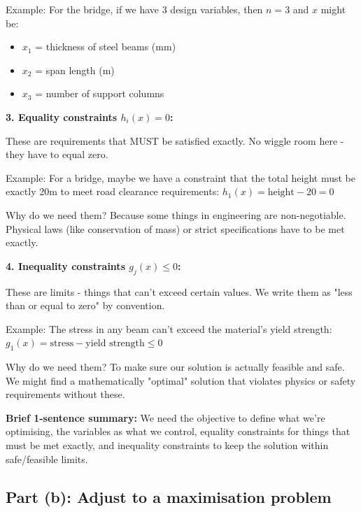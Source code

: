 \documentclass[11pt]{article}
\begin{document}
Example: For the bridge, if we have 3 design variables, then $n=3$ and $x$ might be:
\begin{itemize}
\item $x_1$ = thickness of steel beams (mm)
\item $x_2$ = span length (m)  
\item $x_3$ = number of support columns
\end{itemize}

\vspace{0.5em}

\textbf{3. Equality constraints $h_i(x) = 0$:}

These are requirements that MUST be satisfied exactly. No wiggle room here - they have to equal zero.

Example: For a bridge, maybe we have a constraint that the total height must be exactly 20m to meet road clearance requirements: $h_1(x) = \text{height} - 20 = 0$

Why do we need them? Because some things in engineering are non-negotiable. Physical laws (like conservation of mass) or strict specifications have to be met exactly.

\vspace{0.5em}

\textbf{4. Inequality constraints $g_j(x) \leq 0$:}

These are limits - things that can't exceed certain values. We write them as "less than or equal to zero" by convention.

Example: The stress in any beam can't exceed the material's yield strength: $g_1(x) = \text{stress} - \text{yield strength} \leq 0$

Why do we need them? To make sure our solution is actually feasible and safe. We might find a mathematically "optimal" solution that violates physics or safety requirements without these.

\vspace{1em}

\textbf{Brief 1-sentence summary:} We need the objective to define what we're optimising, the variables as what we control, equality constraints for things that must be met exactly, and inequality constraints to keep the solution within safe/feasible limits.

\subsection{Part (b): Adjust to a maximisation problem}
\end{document}
